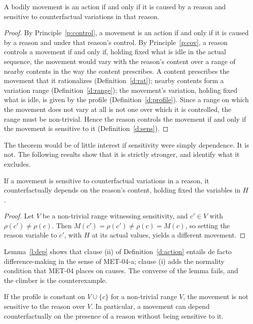 \documentclass{situationist-preprint}
\begin{document}
\begin{theorem}\label{t:main}
A bodily movement is an action if and only if it is caused by a reason and sensitive to counterfactual variations in that reason.
\end{theorem}

\begin{proof}
By Principle~\ref{p:control}, a movement is an action if and only if it is caused by a reason and under that reason's control. By Principle~\ref{p:cov}, a reason controls a movement if and only if, holding fixed what is idle in the actual sequence, the movement would vary with the reason's content over a range of nearby contents in the way the content prescribes. A content prescribes the movement that it rationalizes (Definition~\ref{d:rat}); nearby contents form a variation range (Definition~\ref{d:range}); the movement's variation, holding fixed what is idle, is given by the profile (Definition~\ref{d:profile}). Since a range on which the movement does not vary at all is not one over which it is controlled, the range must be non-trivial. Hence the reason controls the movement if and only if the movement is sensitive to it (Definition~\ref{d:sens}).
\end{proof}

The theorem would be of little interest if sensitivity were simply dependence. It is not. The following results show that it is strictly stronger, and identify what it excludes.

\begin{lemma}\label{l:dep}
If a movement is sensitive to counterfactual variations in a reason, it counterfactually depends on the reason's content, holding fixed the variables in $H$.
\end{lemma}

\begin{proof}
Let $V$ be a non-trivial range witnessing sensitivity, and $c' \in V$ with $\rho(c') \neq \rho(c)$. Then $M(c') = \rho(c') \neq \rho(c) = M(c)$, so setting the reason variable to $c'$, with $H$ at its actual values, yields a different movement.
\end{proof}

Lemma~\ref{l:dep} shows that clause (ii) of Definition~\ref{d:action} entails de facto difference-making in the sense of MET-04-a; clause (i) adds the normality condition that MET-04 places on causes. The converse of the lemma fails, and the climber is the counterexample.

\begin{proposition}\label{p:constant}
If the profile is constant on $V \cup \{c\}$ for a non-trivial range $V$, the movement is not sensitive to the reason over $V$. In particular, a movement can depend counterfactually on the presence of a reason without being sensitive to it.
\end{proposition}
\end{document}
